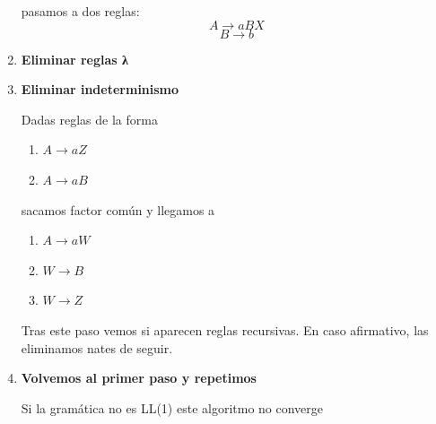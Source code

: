 \documentclass{apuntes}
\begin{document}
\begin{enumerate}
pasamos a dos reglas:
\[A \rightarrow aBX\]
\[B \rightarrow b\]

\item \textbf{Eliminar reglas λ}
\item \textbf{Eliminar indeterminismo}

Dadas reglas de la forma
\begin{enumerate}
\item $A \rightarrow aZ$
\item $A \rightarrow aB$
\end{enumerate}
sacamos factor común y llegamos a
\begin{enumerate}
\item $A \rightarrow aW$
\item $W \rightarrow B$
\item $W \rightarrow Z$
\end{enumerate}

Tras este paso vemos si aparecen reglas recursivas. En caso afirmativo, las eliminamos nates de seguir.
\item \textbf{Volvemos al primer paso y repetimos}

\obs Si la gramática no es LL(1) este algoritmo no converge
\end{enumerate}
\end{document}
